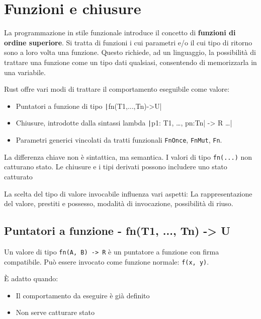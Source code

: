 \section{Funzioni e chiusure}
La programmazione in stile funzionale introduce il concetto di \textbf{funzioni di
  ordine superiore}. Si tratta di funzioni i cui parametri e/o il cui tipo di
ritorno sono a loro volta una funzione. Questo richiede, ad un linguaggio, la
possibilità di trattare una funzione come un tipo dati qualsiasi, consentendo di
memorizzarla in una variabile.

Rust offre vari modi di trattare il comportamento eseguibile come valore:
\begin{itemize}
  \item Puntatori a funzione di tipo \texttt|fn(T1,...,Tn)->U|
  \item Chiusure, introdotte dalla sintassi lambda \texttt|p1: T1, …, pn:Tn| -> R {…}|
  \item Parametri generici vincolati da tratti funzionali \verb|FnOnce|,
        \verb|FnMut|, \verb|Fn|.
\end{itemize}

La differenza chiave non è sintattica, ma semantica. I valori di tipo
\verb|fn(...)| non catturano stato. Le chiusure e i tipi derivati possono
includere uno stato catturato

La scelta del tipo di valore invocabile influenza vari aspetti: La
rappresentazione del valore, prestiti e possesso, modalità di invocazione,
possibilità di riuso.

\subsection{Puntatori a funzione - fn(T1, ..., Tn) -> U}


Un valore di tipo \verb|fn(A, B) -> R| è un
puntatore a funzione con firma
compatibile. Può essere invocato come funzione
normale: \verb|f(x, y)|.


È adatto quando:

\begin{itemize}
  \item Il comportamento da eseguire è già definito
  \item Non serve catturare stato
\end{itemize}

